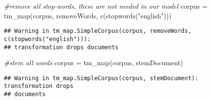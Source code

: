\documentclass[
]{article}
\newenvironment{Shaded}{\begin{snugshade}}{\end{snugshade}}
\newcommand{\CommentTok}[1]{\textcolor[rgb]{0.56,0.35,0.01}{\textit{#1}}}
\newcommand{\FunctionTok}[1]{\textcolor[rgb]{0.00,0.00,0.00}{#1}}
\newcommand{\NormalTok}[1]{#1}
\newcommand{\OtherTok}[1]{\textcolor[rgb]{0.56,0.35,0.01}{#1}}
\newcommand{\StringTok}[1]{\textcolor[rgb]{0.31,0.60,0.02}{#1}}
\begin{document}
\begin{Shaded}
\begin{Highlighting}[]
\CommentTok{\#remove all stop{-}words, these are not needed in our model}
\NormalTok{corpus }\OtherTok{=} \FunctionTok{tm\_map}\NormalTok{(corpus, removeWords, }\FunctionTok{c}\NormalTok{(}\FunctionTok{stopwords}\NormalTok{(}\StringTok{"english"}\NormalTok{)))}
\end{Highlighting}
\end{Shaded}

\begin{verbatim}
## Warning in tm_map.SimpleCorpus(corpus, removeWords, c(stopwords("english"))):
## transformation drops documents
\end{verbatim}

\begin{Shaded}
\begin{Highlighting}[]
\CommentTok{\#stem all words}
\NormalTok{corpus }\OtherTok{=} \FunctionTok{tm\_map}\NormalTok{(corpus, stemDocument)}
\end{Highlighting}
\end{Shaded}

\begin{verbatim}
## Warning in tm_map.SimpleCorpus(corpus, stemDocument): transformation drops
## documents
\end{verbatim}
\end{document}
